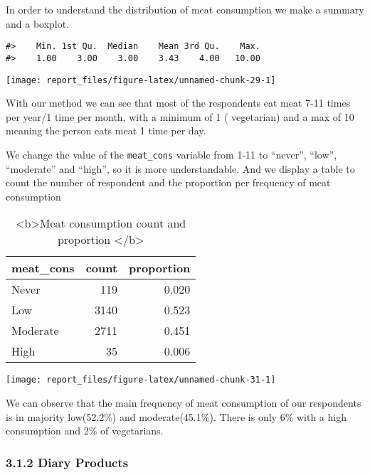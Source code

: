 \documentclass[
]{article}
\begin{document}
In order to understand the distribution of meat consumption we make a
summary and a boxplot.

\begin{verbatim}
#>    Min. 1st Qu.  Median    Mean 3rd Qu.    Max. 
#>    1.00    3.00    3.00    3.43    4.00   10.00
\end{verbatim}

\begin{center}\texttt{[image: report\_files/figure-latex/unnamed-chunk-29-1]} \end{center}

With our method we can see that most of the respondents eat meat 7-11
times per year/1 time per month, with a minimum of 1 ( vegetarian) and a
max of 10 meaning the person eats meat 1 time per day.

We change the value of the \texttt{meat\_cons} variable from 1-11 to
``never'', ``low'', ``moderate'' and ``high'', so it is more
understandable. And we display a table to count the number of respondent
and the proportion per frequency of meat consumption

\begin{table}

\caption{\label{tab:unnamed-chunk-31}<b>Meat consumption count and proportion </b>}
\centering
\begin{tabular}[t]{l|r|r}
\hline
meat\_cons & count & proportion\\
\hline
Never & 119 & 0.020\\
\hline
Low & 3140 & 0.523\\
\hline
Moderate & 2711 & 0.451\\
\hline
High & 35 & 0.006\\
\hline
\end{tabular}
\end{table}

\begin{center}\texttt{[image: report\_files/figure-latex/unnamed-chunk-31-1]} \end{center}

We can observe that the main frequency of meat consumption of our
respondents is in majority low(52.2\%) and moderate(45.1\%). There is
only 6\% with a high consumption and 2\% of vegetarians.

\hypertarget{diary-products}{%
\subsubsection{3.1.2 Diary Products}\label{diary-products}}
\end{document}
